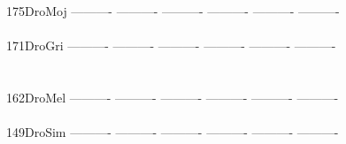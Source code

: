 \documentclass[11pt,twoside,reqno,a4paper]{article}
\begin{document}
{175\hspace*{2\charwidth}DroMoj	----------	----------	----------	----------	----------	----------	\\
\hspace*{5\charwidth}\hspace*{7\charwidth}\hspace*{1\charwidth}\hspace*{1\charwidth}\hspace*{1\charwidth}\hspace*{1\charwidth}\hspace*{1\charwidth}\hspace*{1\charwidth}\\
171\hspace*{2\charwidth}DroGri	----------	----------	----------	----------	----------	----------	\\
\hspace*{5\charwidth}\hspace*{7\charwidth}\hspace*{1\charwidth}\hspace*{1\charwidth}\hspace*{1\charwidth}\hspace*{1\charwidth}\hspace*{1\charwidth}\hspace*{1\charwidth}\\
\\
162\hspace*{2\charwidth}DroMel	----------	----------	----------	----------	----------	----------	\\
\hspace*{5\charwidth}\hspace*{7\charwidth}\hspace*{1\charwidth}\hspace*{1\charwidth}\hspace*{1\charwidth}\hspace*{1\charwidth}\hspace*{1\charwidth}\hspace*{1\charwidth}\\
149\hspace*{2\charwidth}DroSim	----------	----------	----------	----------	----------	----------	\\
\hspace*{5\charwidth}\hspace*{7\charwidth}\hspace*{1\charwidth}\hspace*{1\charwidth}\hspace*{1\charwidth}\hspace*{1\charwidth}\hspace*{1\charwidth}\hspace*{1\charwidth}\\
}
\end{document}
